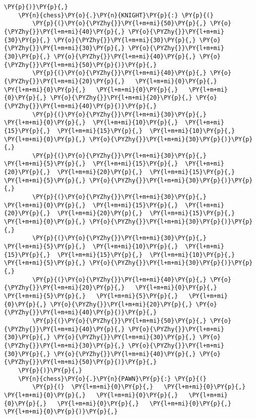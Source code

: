 \begin{tcolorbox}[fontupper=\linespread{.66}\selectfont, breakable, size=fbox, boxrule=1pt, pad at break*=1mm,colback=cellbackground, colframe=cellborder]
\begin{Verbatim}[commandchars=\\\{\}]
    \PY{p}{)}\PY{p}{,}
    \PY{n}{chess}\PY{o}{.}\PY{n}{KNIGHT}\PY{p}{:} \PY{p}{(}
        \PY{p}{(}\PY{o}{\PYZhy{}}\PY{l+m+mi}{50}\PY{p}{,} \PY{o}{\PYZhy{}}\PY{l+m+mi}{40}\PY{p}{,} \PY{o}{\PYZhy{}}\PY{l+m+mi}{30}\PY{p}{,} \PY{o}{\PYZhy{}}\PY{l+m+mi}{30}\PY{p}{,} \PY{o}{\PYZhy{}}\PY{l+m+mi}{30}\PY{p}{,} \PY{o}{\PYZhy{}}\PY{l+m+mi}{30}\PY{p}{,} \PY{o}{\PYZhy{}}\PY{l+m+mi}{40}\PY{p}{,} \PY{o}{\PYZhy{}}\PY{l+m+mi}{50}\PY{p}{)}\PY{p}{,}
        \PY{p}{(}\PY{o}{\PYZhy{}}\PY{l+m+mi}{40}\PY{p}{,} \PY{o}{\PYZhy{}}\PY{l+m+mi}{20}\PY{p}{,}   \PY{l+m+mi}{0}\PY{p}{,}   \PY{l+m+mi}{0}\PY{p}{,}   \PY{l+m+mi}{0}\PY{p}{,}   \PY{l+m+mi}{0}\PY{p}{,} \PY{o}{\PYZhy{}}\PY{l+m+mi}{20}\PY{p}{,} \PY{o}{\PYZhy{}}\PY{l+m+mi}{40}\PY{p}{)}\PY{p}{,}
        \PY{p}{(}\PY{o}{\PYZhy{}}\PY{l+m+mi}{30}\PY{p}{,}   \PY{l+m+mi}{0}\PY{p}{,}  \PY{l+m+mi}{10}\PY{p}{,}  \PY{l+m+mi}{15}\PY{p}{,}  \PY{l+m+mi}{15}\PY{p}{,}  \PY{l+m+mi}{10}\PY{p}{,}   \PY{l+m+mi}{0}\PY{p}{,} \PY{o}{\PYZhy{}}\PY{l+m+mi}{30}\PY{p}{)}\PY{p}{,}
        \PY{p}{(}\PY{o}{\PYZhy{}}\PY{l+m+mi}{30}\PY{p}{,}   \PY{l+m+mi}{5}\PY{p}{,}  \PY{l+m+mi}{15}\PY{p}{,}  \PY{l+m+mi}{20}\PY{p}{,}  \PY{l+m+mi}{20}\PY{p}{,}  \PY{l+m+mi}{15}\PY{p}{,}   \PY{l+m+mi}{5}\PY{p}{,} \PY{o}{\PYZhy{}}\PY{l+m+mi}{30}\PY{p}{)}\PY{p}{,}
        \PY{p}{(}\PY{o}{\PYZhy{}}\PY{l+m+mi}{30}\PY{p}{,}   \PY{l+m+mi}{0}\PY{p}{,}  \PY{l+m+mi}{15}\PY{p}{,}  \PY{l+m+mi}{20}\PY{p}{,}  \PY{l+m+mi}{20}\PY{p}{,}  \PY{l+m+mi}{15}\PY{p}{,}   \PY{l+m+mi}{0}\PY{p}{,} \PY{o}{\PYZhy{}}\PY{l+m+mi}{30}\PY{p}{)}\PY{p}{,}
        \PY{p}{(}\PY{o}{\PYZhy{}}\PY{l+m+mi}{30}\PY{p}{,}   \PY{l+m+mi}{5}\PY{p}{,}  \PY{l+m+mi}{10}\PY{p}{,}  \PY{l+m+mi}{15}\PY{p}{,}  \PY{l+m+mi}{15}\PY{p}{,}  \PY{l+m+mi}{10}\PY{p}{,}   \PY{l+m+mi}{5}\PY{p}{,} \PY{o}{\PYZhy{}}\PY{l+m+mi}{30}\PY{p}{)}\PY{p}{,}
        \PY{p}{(}\PY{o}{\PYZhy{}}\PY{l+m+mi}{40}\PY{p}{,} \PY{o}{\PYZhy{}}\PY{l+m+mi}{20}\PY{p}{,}   \PY{l+m+mi}{0}\PY{p}{,}   \PY{l+m+mi}{5}\PY{p}{,}   \PY{l+m+mi}{5}\PY{p}{,}   \PY{l+m+mi}{0}\PY{p}{,} \PY{o}{\PYZhy{}}\PY{l+m+mi}{20}\PY{p}{,} \PY{o}{\PYZhy{}}\PY{l+m+mi}{40}\PY{p}{)}\PY{p}{,}
        \PY{p}{(}\PY{o}{\PYZhy{}}\PY{l+m+mi}{50}\PY{p}{,} \PY{o}{\PYZhy{}}\PY{l+m+mi}{40}\PY{p}{,} \PY{o}{\PYZhy{}}\PY{l+m+mi}{30}\PY{p}{,} \PY{o}{\PYZhy{}}\PY{l+m+mi}{30}\PY{p}{,} \PY{o}{\PYZhy{}}\PY{l+m+mi}{30}\PY{p}{,} \PY{o}{\PYZhy{}}\PY{l+m+mi}{30}\PY{p}{,} \PY{o}{\PYZhy{}}\PY{l+m+mi}{40}\PY{p}{,} \PY{o}{\PYZhy{}}\PY{l+m+mi}{50}\PY{p}{)}\PY{p}{,}
    \PY{p}{)}\PY{p}{,}
    \PY{n}{chess}\PY{o}{.}\PY{n}{PAWN}\PY{p}{:} \PY{p}{(}
        \PY{p}{(}  \PY{l+m+mi}{0}\PY{p}{,}   \PY{l+m+mi}{0}\PY{p}{,}   \PY{l+m+mi}{0}\PY{p}{,}   \PY{l+m+mi}{0}\PY{p}{,}   \PY{l+m+mi}{0}\PY{p}{,}   \PY{l+m+mi}{0}\PY{p}{,}   \PY{l+m+mi}{0}\PY{p}{,}   \PY{l+m+mi}{0}\PY{p}{)}\PY{p}{,}

\end{Verbatim}
\end{tcolorbox}
